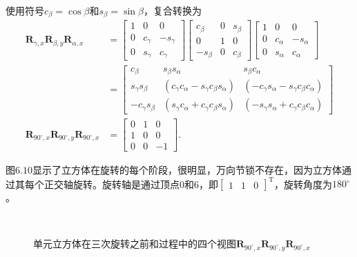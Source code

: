 使用符号$c_{\beta}=\cos \beta$和$s_{\beta}=\sin \beta$，复合转换为
$$
\begin{aligned}
\mathbf{R}_{\gamma, x} \mathbf{R}_{\beta, y} \mathbf{R}_{\alpha, x} & =\left[\begin{array}{ccc}
1 & 0 & 0 \\
0 & c_{\gamma} & -s_{\gamma} \\
0 & s_{\gamma} & c_{\gamma}
\end{array}\right]\left[\begin{array}{ccc}
c_{\beta} & 0 & s_{\beta} \\
0 & 1 & 0 \\
-s_{\beta} & 0 & c_{\beta}
\end{array}\right]\left[\begin{array}{ccc}
1 & 0 & 0 \\
0 & c_{\alpha} & -s_{\alpha} \\
0 & s_{\alpha} & c_{\alpha}
\end{array}\right] \\
& =\left[\begin{array}{ccc}
c_{\beta} & s_{\beta} s_{\alpha} & s_{\beta} c_{\alpha} \\
s_{\gamma} s_{\beta} & \left(c_{\gamma} c_{\alpha}-s_{\gamma} c_{\beta} s_{\alpha}\right) & \left(-c_{\gamma} s_{\alpha}-s_{\gamma} c_{\beta} c_{\alpha}\right) \\
-c_{\gamma} s_{\beta} & \left(s_{\gamma} c_{\alpha}+c_{\gamma} c_{\beta} s_{\alpha}\right) & \left(-s_{\gamma} s_{\alpha}+c_{\gamma} c_{\beta} c_{\alpha}\right)
\end{array}\right] \\
\mathbf{R}_{90^{\circ}, x} \mathbf{R}_{90^{\circ}, y} \mathbf{R}_{90^{\circ}, x} & =\left[\begin{array}{ccc}
0 & 1 & 0 \\
1 & 0 & 0 \\
0 & 0 & -1
\end{array}\right] .
\end{aligned}
$$

图$6.10$显示了立方体在旋转的每个阶段，很明显，万向节锁不存在，因为立方体通过其每个正交轴旋转。旋转轴是通过顶点0和6，即$\left[\begin{array}{lll}1 & 1 & 0\end{array}\right]^{\mathrm{T}}$，旋转角度为$180^{\circ}$。

\begin{figure}[h!]
    \centering
    \\
    \caption[short]{单元立方体在三次旋转之前和过程中的四个视图$\mathbf{R}_{90^{\circ}, x} \mathbf{R}_{90^{\circ}, y} \mathbf{R}_{90^{\circ}, x}$}
\end{figure}

